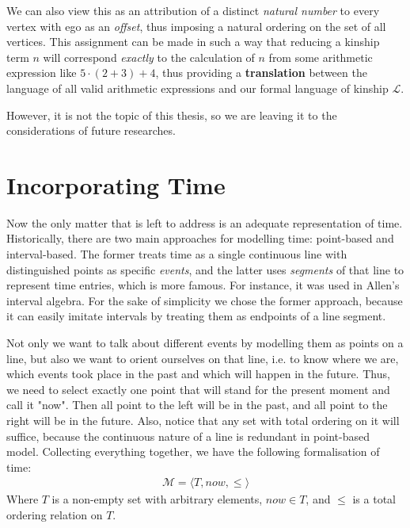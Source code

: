    We can also view this as an attribution of a distinct \textit{natural number} to every vertex with ego as an \textit{offset}, thus
    imposing a natural ordering on the set of all vertices. This assignment can be made in such a way that reducing a kinship term $n$
    will correspond \textit{exactly} to the calculation of $n$ from some arithmetic expression like $5 \cdot (2 + 3) + 4$, thus
    providing a \textbf{translation} between the language of all valid arithmetic expressions and our formal language of kinship
    $\mathcal{L}$.

    However, it is not the topic of this thesis, so we are leaving it to the considerations of future researches.

\section{Incorporating Time}
    Now the only matter that is left to address is an adequate representation of time. Historically, there are two main approaches
    for modelling time: point-based and interval-based. The former treats time as a single continuous line with distinguished points
    as specific \textit{events}, and the latter uses \textit{segments} of that line to represent time entries, which is more famous.
    For instance, it was used in Allen's interval algebra\cite{allen}. For the sake of simplicity we chose the former approach,
    because it can easily imitate intervals by treating them as endpoints of a line segment.

    Not only we want to talk about different events by modelling them as points on a line, but also we want to orient ourselves on
    that line, i.e. to know where we are, which events took place in the past and which will happen in the future. Thus, we need to
    select exactly one point that will stand for the present moment and call it "now". Then all point to the left will be in the past,
    and all point to the right will be in the future. Also, notice that any set with total ordering on it will suffice, because the
    continuous nature of a line is redundant in point-based model. Collecting everything together, we have the following formalisation
    of time:
    \begin{align*}
        \mathcal{M} = \langle T, now, \leqslant \rangle
    \end{align*}
    Where $T$ is a non-empty set with arbitrary elements, $now \in T$, and $\leqslant$ is a total ordering relation on $T$.

